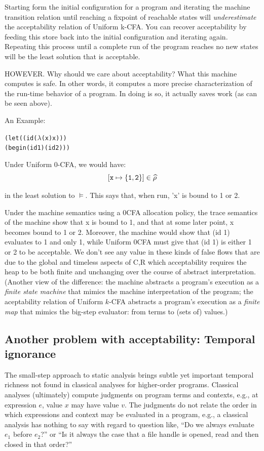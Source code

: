 \documentclass[preprint,onecolumn,9pt]{sigplanconf} %
\begin{document}
Starting form the initial configuration for a program and iterating
the machine transition relation until reaching a fixpoint of reachable
states will \emph{underestimate} the acceptability relation of Uniform
k-CFA.  You can recover acceptability by feeding this store back into
the initial configuration and iterating again.  Repeating this process
until a complete run of the program reaches no new states will be the
least solution that is acceptable.

HOWEVER.  Why should we care about acceptability?  What this
machine computes is safe.  In other words, it computes a more
precise characterization of the run-time behavior of a program.  In
doing is so, it actually saves work (as can be seen above).

An Example:

\begin{alltt}
 (let ((id (\(\lambda\) (x) x)))
   (begin (id 1) (id 2)))
\end{alltt}

Under Uniform 0-CFA, we would have:
\[
   [{\tt x} \mapsto \{{\tt 1}, {\tt 2}\}] \in \widehat\rho
\]

in the least solution to $\models$.  This says that, when run, 'x' is
bound to 1 or 2.

Under the machine semantics using a 0CFA allocation policy, the trace
semantics of the machine show that x is bound to 1, and that at some
later point, x becomes bound to 1 or 2.  Moreover, the machine would
show that (id 1) evaluates to 1 and only 1, while Uniform 0CFA must
give that (id 1) is either 1 or 2 to be acceptable.  We don't see any
value in these kinds of false flows that are due to the global and
timeless aspects of C,R which acceptability requires the heap to be
both finite and unchanging over the course of abstract
interpretation. (Another view of the difference: the machine abstracts
a program's execution as a \emph{finite state machine} that mimics the
machine interpretation of the program; the aceptability relation of
Uniform \(k\)-CFA abstracts a program's execution as a \emph{finite
  map} that mimics the big-step evaluator: from terms to (sets of)
values.)


\subsection{Another problem with acceptability: Temporal ignorance}

The small-step approach to static analysis brings subtle yet important temporal
richness not found in classical analyses for higher-order programs.
%
Classical analyses (ultimately) compute judgments on program terms and
contexts, e.g., at expression $e$, value $x$ may have value $v$.
%
The judgments do not relate the order in which expressions and context may be
evaluated in a program, e.g., a classical analysis has nothing to say with
regard to question like, ``Do we always evaluate $e_1$ before $e_2$?'' or ``Is
it always the case that a file handle is opened, read and then closed in that
order?''
\end{document}
